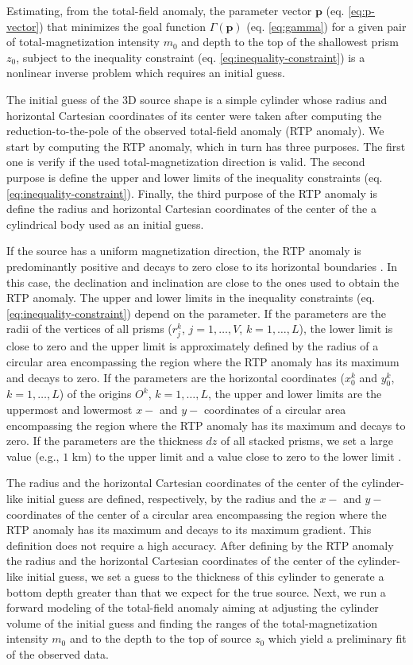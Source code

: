 Estimating, from the total-field anomaly, the parameter vector $\mathbf{p}$ (eq. \ref{eq:p-vector}) that minimizes the goal function $\Gamma(\mathbf{p})$ (eq. \ref{eq:gamma}) 
for a given pair of total-magnetization intensity $m_{0}$ and depth to the top of the 
shallowest prism $z_{0}$, subject to the inequality constraint 
(eq. \ref{eq:inequality-constraint}) is a nonlinear inverse problem 
which requires an initial guess. 

The initial guess of the 3D source shape is a simple cylinder whose radius and horizontal Cartesian coordinates of its center were taken after computing the reduction-to-the-pole of the observed total-field anomaly (RTP anomaly).
We start by computing the RTP anomaly, which in turn has three purposes.
The first one is verify if the used total-magnetization direction is valid.
The second purpose is define the upper and lower limits of the inequality constraints 
(eq. \ref{eq:inequality-constraint}).
Finally, the third purpose of the RTP anomaly is define the radius and horizontal Cartesian coordinates of the center of the a cylindrical body used as an initial guess.

If the source has a uniform magnetization direction, the RTP anomaly is predominantly positive and decays to zero close to its horizontal boundaries \cite[]{reis-etal2020}. 
In this case, the declination and inclination are close to the ones used to obtain the RTP anomaly.
The upper and lower limits in the inequality constraints (eq. \ref{eq:inequality-constraint}) depend on the parameter. 
If the parameters are the radii of the vertices of all prisms 
($r^{k}_{j}$, $j=1,\dots , V$, $k=1,\dots ,L$), the lower limit is close to zero and the upper limit is approximately defined by the radius of a circular area encompassing the region where the RTP anomaly has its maximum and decays to zero.
If the parameters are the horizontal coordinates ($x_{0}^{k}$ and $y_{0}^{k}$, $k=1,\dots ,L$) of the origins $O^{k}$, $k=1,\dots ,L$, the upper and lower limits are 
the uppermost and lowermost $x-$ and $y-$ coordinates of a circular area encompassing the region where the RTP anomaly has its maximum and decays to zero.
If the parameters are the thickness $dz$ of all stacked prisms, we set a large value 
(e.g., $1$ km) to the upper limit and a value close to zero to the lower limit .

The radius and the horizontal Cartesian coordinates of the center of the cylinder-like initial guess are defined, respectively, by the radius and the $x-$ and $y-$ coordinates of the center of a circular area encompassing the region where the RTP anomaly has 
its maximum and decays to its maximum gradient. 
This definition does not require a high accuracy. 
After defining by the RTP anomaly the radius and the horizontal Cartesian coordinates of the center of the cylinder-like initial guess, we set a guess to the thickness 
of this cylinder to generate a bottom depth greater than that we expect for the true source. 
Next, we run a forward modeling of the total-field anomaly aiming at adjusting the cylinder volume of the initial guess and finding the ranges of the total-magnetization intensity $m_{0}$ and to the depth to the top of source $z_{0}$ which yield a preliminary fit of the observed data.

